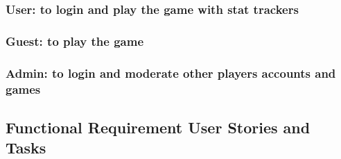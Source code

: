 \documentclass[12pt]{article}
\begin{document}
\subsubsection{User: to login and play the game with stat trackers}
\subsubsection{Guest: to play the game}
\subsubsection{Admin: to login and moderate other players accounts and games}




\subsection{Functional Requirement User Stories and Tasks}

\end{document}
